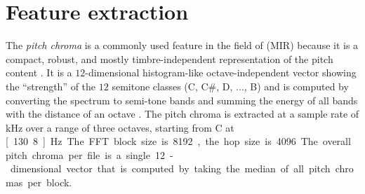 \documentclass{article}
\begin{document}

\section{Feature extraction}\label{sec:pitch_chroma}

The \textit{pitch chroma} is a commonly used feature in the field of (MIR) because it is a compact, robust, and mostly timbre-independent representation of the pitch content  \cite{muller_information_2007}. It is a $12$-dimensional histogram-like octave-independent vector showing the ``strength'' of the $12$ semitone classes (C, C\#, D, ..., B) and is computed by converting the spectrum to semi-tone bands and summing the energy of all bands with the distance of an octave \cite{fujishima_realtime_1999}. 
The pitch chroma is extracted at a sample rate of \unit[10]{kHz} over a range of three octaves, starting from C at \unit[130.8]{Hz}. The FFT block size is 8192, the hop size is 4096.
The overall pitch chroma per file is a single 12-dimensional vector that is computed by taking the median of all pitch chromas per block. 

\end{document}
